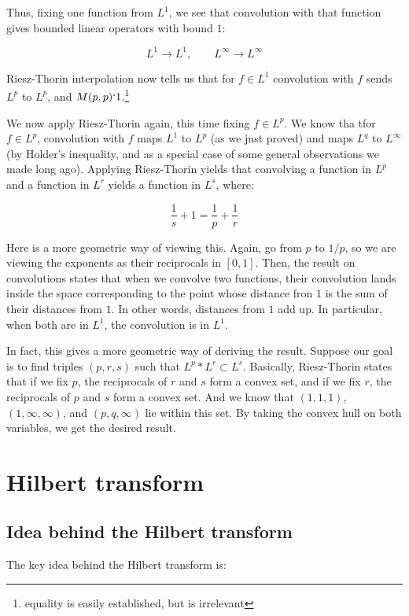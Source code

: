 \documentclass[a4paper]{amsart}
\begin{document}
Thus, fixing one function from $L^1$, we see that convolution with
that function gives bounded linear operators with bound $1$:

$$L^1 \to L^1, \qquad L^\infty \to L^\infty$$

Riesz-Thorin interpolation now tells us that for $f \in L^1$
convolution with $f$ sends $L^p$ to $L^p$, and $M(p,p) \lq
1$.\footnote{equality is easily established, but is irrelevant}

We now apply Riesz-Thorin again, this time fixing $f \in L^p$. We know
tha tfor $f \in L^p$, convolution with $f$ maps $L^1$ to $L^p$ (as we
just proved) and maps $L^q$ to $L^\infty$ (by Holder's inequality, and
as a special case of some general observations we made long
ago). Applying Riesz-Thorin yields that convolving a function in $L^p$
and a function in $L^r$ yields a function in $L^s$, where:

$$\frac{1}{s} + 1 = \frac{1}{p} + \frac{1}{r}$$

Here is a more geometric way of viewing this. Again, go from $p$ to
$1/p$, so we are viewing the exponents as their reciprocals in
$[0,1]$. Then, the result on convolutions states that when we convolve
two functions, their convolution lands inside the space corresponding
to the point whose distance fron $1$ is the sum of their distances
from $1$. In other words, distances from $1$ add up. In particular, when both are
in $L^1$, the convolution is in $L^1$.

In fact, this gives a more geometric way of deriving the
result. Suppose our goal is to find triples $(p,r,s)$ such that $L^p *
L^r \subset L^s$. Basically, Riesz-Thorin states that if we fix $p$,
the reciprocals of $r$ and $s$ form a convex set, and if we fix $r$,
the reciprocals of $p$ and $s$ form a convex set. And we know that
$(1,1,1)$, $(1,\infty,\infty)$, and $(p,q,\infty)$ lie within this
set. By taking the convex hull on both variables, we get the desired
result.

\section{Hilbert transform}

\subsection{Idea behind the Hilbert transform}

The key idea behind the Hilbert transform is:
\end{document}
